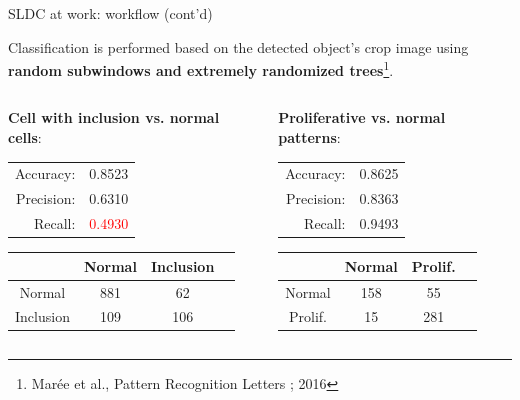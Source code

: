 \documentclass{beamer}
\begin{document}
\begin{frame}{SLDC at work: workflow (cont'd)}

	Classification is performed based on the detected object's crop image using \textbf{random subwindows and extremely randomized trees}\footnote[frame]{Marée et al., Pattern Recognition Letters ; 2016}.
	
	\vfill
	
	\begin{columns}
		\footnotesize
		\begin{column}{0.492\linewidth}
			
			\textbf{Cell with inclusion vs. normal cells}: 
			
			\vspace{0.4cm}
			
			\begin{tabular}{rc}
			  Accuracy:  & 0.8523 \\
			  Precision: & 0.6310 \\
			  Recall:    & \textcolor{red}{0.4930} \\
			\end{tabular}
			
			\vspace{0.4cm}
			
			\begin{tabular}{c|ccc}
				& Normal & Inclusion \\
				\hline
				Normal & 881 & 62 \\
				Inclusion & 109 & 106 \\
			\end{tabular}

		\end{column}
		
		\begin{column}{0.49\linewidth}
		
			\textbf{Proliferative vs. normal patterns}:
			 
			\vspace{0.4cm}

			\begin{tabular}{rc}
			  Accuracy:  & 0.8625 \\
			  Precision: & 0.8363 \\
			  Recall:    & 0.9493 \\
			\end{tabular}
			
			\vspace{0.4cm}
			
			\begin{tabular}{c|ccc}
				& Normal & Prolif. \\
				\hline
				Normal & 158 & 55 \\
				Prolif. & 15 & 281 \\
			\end{tabular}
			
		\end{column}

	\end{columns}
	
\end{frame}
\end{document}
